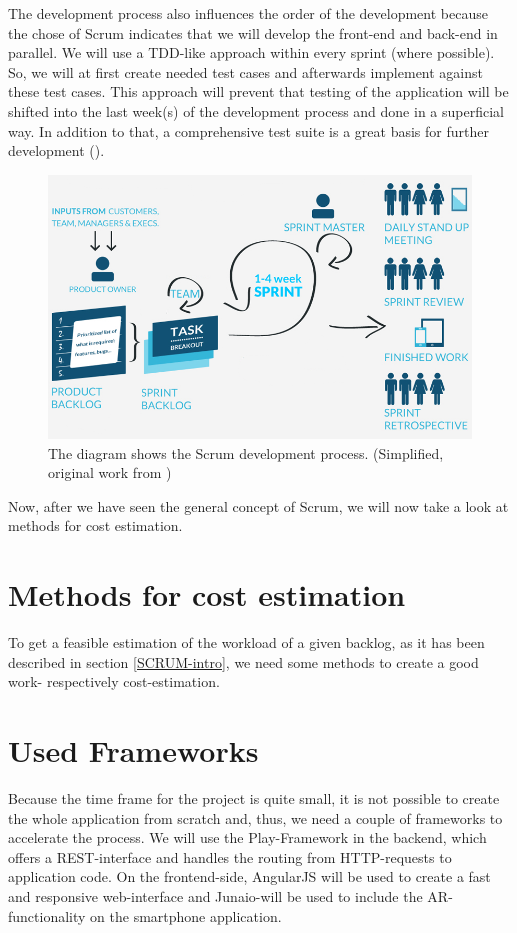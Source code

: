 The development process also influences the order of the development because the chose of Scrum indicates that we will develop the front-end and back-end in parallel. We will use a \ac{TDD}-like approach within every sprint (where possible). So, we will at first create needed test cases and afterwards implement against these test cases. This approach will prevent that testing of the application will be shifted into the last week(s) of the development process and done in a superficial way. In addition to that, a comprehensive test suite is a great basis for further development (\cite{max03}).

\begin{figure}[th]
\centerline{\includegraphics[width=1\textwidth]{gfx/scrum}}
\caption{The diagram shows the Scrum development process. (Simplified, original work from \cite{SCRUMPic})}
\label{ScrumDia}
\end{figure}

Now, after we have seen the general concept of Scrum, we will now take a look at methods for cost estimation. 

\section{Methods for cost estimation}
To get a feasible estimation of the workload of a given backlog, as it has been described in section \ref{SCRUM-intro}, we need some methods to create a good work- respectively cost-estimation.

\section{Used Frameworks}
Because the time frame for the project is quite small, it is not possible to create the whole application from scratch and, thus, we need a couple of frameworks to accelerate the process. We will use the Play-Framework in the backend, which offers a \ac{REST}-interface and handles the routing from \ac{HTTP}-requests to application code. On the frontend-side, AngularJS will be used to create a fast and responsive web-interface and Junaio-will be used to include the \ac{AR}-functionality on the smartphone application.

